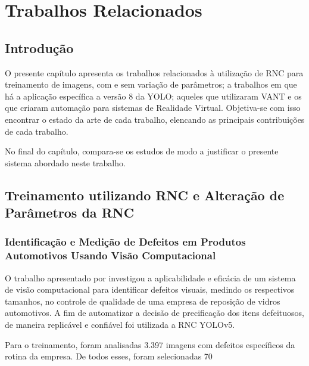 \chapter{Trabalhos Relacionados}

\section{Introdução}

O presente capítulo apresenta os trabalhos relacionados à utilização de RNC para treinamento de imagens, com e sem variação de parâmetros; a trabalhos em que há a aplicação específica a versão 8 da YOLO; aqueles que utilizaram VANT e os que criaram automação para sistemas de Realidade Virtual. Objetiva-se com isso encontrar o estado da arte de cada trabalho, elencando as principais contribuições de cada trabalho.

No final do capítulo, compara-se os estudos de modo a justificar o presente sistema abordado neste trabalho. 

\section{Treinamento utilizando RNC e Alteração de Parâmetros da RNC}
\subsection{Identificação e Medição de Defeitos em Produtos Automotivos Usando Visão Computacional}

O trabalho apresentado por \cite{gonzaga2023identificaccao} investigou a aplicabilidade e eficácia de um sistema de visão computacional para identificar defeitos visuais, medindo os respectivos tamanhos, no controle de qualidade de uma empresa de reposição de vidros automotivos. A fim de automatizar a decisão de precificação dos itens defeituosos, de maneira replicável e confiável foi utilizada a RNC YOLOv5. 

Para o treinamento, foram analisadas 3.397 imagens com defeitos específicos da rotina da empresa. De todos esses, foram selecionadas 70%


